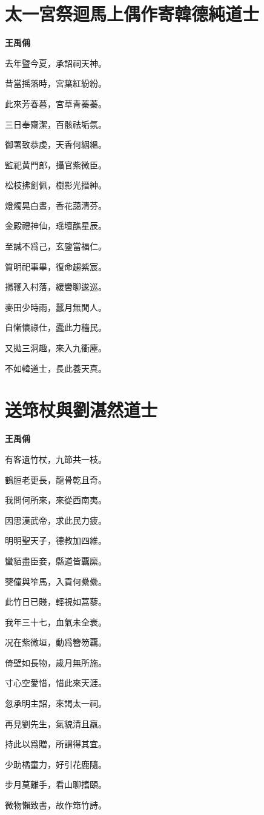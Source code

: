 \documentclass[12pt,a4paper]{ctexbook}
\begin{document}
\section{太一宮祭迴馬上偶作寄韓德純道士}
\textbf{王禹偁}\par\vspace{0.5em}
去年暨今夏，承詔祠天神。\par
昔當摇落時，宮葉紅紛紛。\par
此來芳春暮，宮草青蓁蓁。\par
三日奉齋潔，百骸祛垢氛。\par
御署致恭虔，天香何絪縕。\par
監祀黄門郎，攝官紫微臣。\par
松枝拂劍佩，樹影光搢紳。\par
燈燭晃白晝，香花藹清芬。\par
金殿禮神仙，瑶壇醮星辰。\par
至誠不爲己，玄鑒當福仁。\par
質明祀事畢，復命趨紫宸。\par
揚鞭入村落，緩轡聊逡巡。\par
麥田少時雨，蠶月無閒人。\par
自慚懷祿仕，蠹此力穡民。\par
又拋三洞趣，來入九衢塵。\par
不如韓道士，長此養天真。\par

\section{送筇杖與劉湛然道士}
\textbf{王禹偁}\par\vspace{0.5em}
有客遺竹杖，九節共一枝。\par
鶴脰老更長，龍骨乾且奇。\par
我問何所來，來從西南夷。\par
因思漢武帝，求此民力疲。\par
明明聖天子，德教加四維。\par
蠻貊盡臣妾，縣道皆覊縻。\par
僰僮與笮馬，入貢何纍纍。\par
此竹日已賤，輕視如蒿藜。\par
我年三十七，血氣未全衰。\par
况在紫微垣，動爲簪笏覊。\par
倚壁如長物，歲月無所施。\par
寸心空愛惜，惜此來天涯。\par
忽承明主詔，來謁太一祠。\par
再見劉先生，氣貌清且羸。\par
持此以爲贈，所謂得其宜。\par
少助橘童力，好引花鹿隨。\par
步月莫離手，看山聊搘頤。\par
微物懶致書，故作筇竹詩。\par
\end{document}
